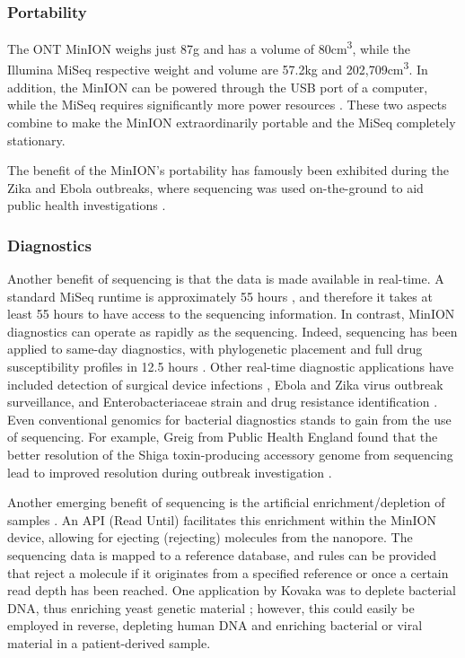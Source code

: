 \subsubsection{Portability}
The ONT MinION weighs just 87g and has a volume of 80cm\textsuperscript{3}, while the Illumina MiSeq respective weight and volume are 57.2kg and 202,709cm\textsuperscript{3}. In addition, the MinION can be powered through the USB port of a computer, while the MiSeq requires significantly more power resources \cite{Tedersoo2021}. These two aspects combine to make the MinION extraordinarily portable and the MiSeq completely stationary.

The benefit of the MinION's portability has famously been exhibited during the Zika and Ebola outbreaks, where \ont{} sequencing was used on-the-ground to aid public health investigations \cite{faria2016,Hoenen2016,quick2016}.

\subsubsection{Diagnostics}
Another benefit of \ont{} sequencing is that the data is made available in real-time. A standard MiSeq runtime is approximately 55 hours \cite{Tedersoo2021}, and therefore it takes at least 55 hours to have access to the sequencing information. In contrast, MinION diagnostics can operate as rapidly as the sequencing. Indeed, \ont{} sequencing has been applied to same-day \mtb{} diagnostics, with phylogenetic placement and full drug susceptibility profiles in 12.5 hours \cite{Votintseva2017}. Other real-time diagnostic applications have included detection of surgical device infections \cite{Sanderson2018}, Ebola \cite{Hoenen2016,quick2016} and Zika \cite{faria2016} virus outbreak surveillance, and Enterobacteriaceae strain and drug resistance identification \cite{Cao2016}. Even conventional genomics for bacterial diagnostics stands to gain from the use of \ont{} sequencing. For example, Greig \etal{} from Public Health England found that the better resolution of the Shiga toxin-producing \ecoli{} accessory genome from \ont{} sequencing lead to improved resolution during outbreak investigation \cite{greig2021}.

Another emerging benefit of \ont{} sequencing is the artificial enrichment/depletion of samples \cite{Payne2021,Kovaka2021}. An API (Read Until) facilitates this enrichment within the MinION device, allowing for ejecting (rejecting) molecules from the nanopore. The sequencing data is mapped to a reference database, and rules can be provided that reject a molecule if it originates from a specified reference or once a certain read depth has been reached. One application by Kovaka \etal{} was to deplete bacterial DNA, thus enriching yeast genetic material \cite{Kovaka2021}; however, this could easily be employed in reverse, depleting human DNA and enriching bacterial or viral material in a patient-derived sample.  

